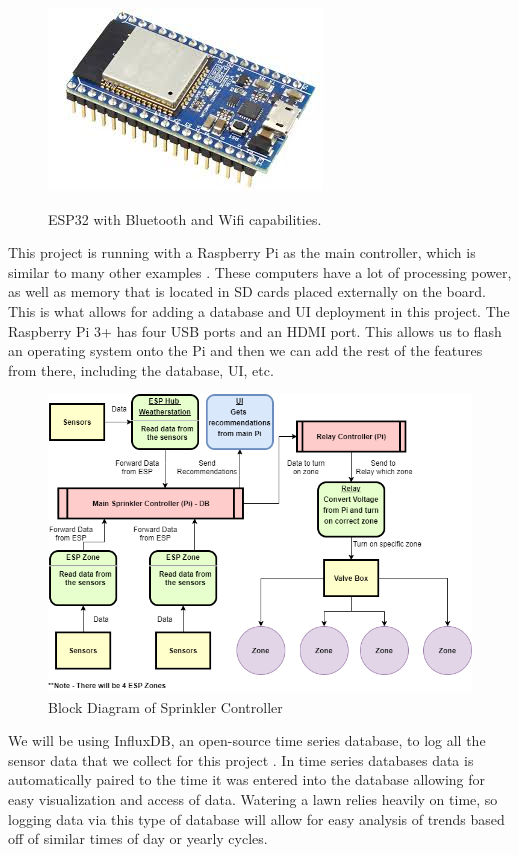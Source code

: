 \documentclass[letterpaper, 10 pt, conference]{ieeeconf}  %
\begin{document}
\begin{figure}[H]
    \centering
    \includegraphics[scale=.5]{ESP32.jpg}
    \caption{ESP32 with Bluetooth and Wifi capabilities.}
    \label{fig:esp_label} \cite{ESP32}
\end{figure}

This project is running with a Raspberry Pi as the main controller, which is similar to many other examples \cite{SIP}. These computers have a lot of processing power, as well as memory that is located in SD cards placed externally on the board. This is what allows for adding a database and UI deployment in this project. The Raspberry Pi 3+ has four USB ports and an HDMI port. This allows us to flash an operating system onto the Pi and then we can add the rest of the features from there, including the database, UI, etc. 

\begin{figure}
	\centering
	\includegraphics[width=\textwidth]{Diagram.png}
	\caption{Block Diagram of Sprinkler Controller}
	\label{label1}
\end{figure}

We will be using InfluxDB, an open-source time series database, to log all the sensor data that we collect for this project \cite{influxdb}. In time series databases data is automatically paired to the time it was entered into the database allowing for easy visualization and access of data. Watering a lawn relies heavily on time, so logging data via this type of database will allow for easy analysis of trends based off of similar times of day or yearly cycles.
\end{document}

